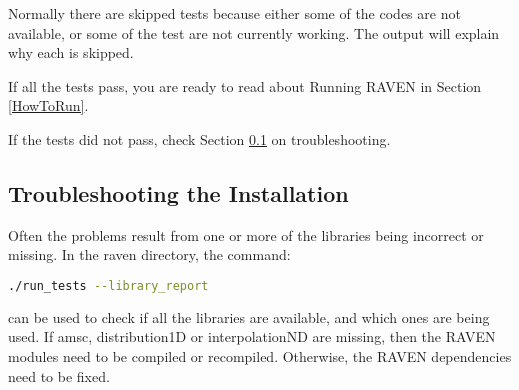 Normally there are skipped tests because either some of the codes are
not available, or some of the test are not currently working.  The
output will explain why each is skipped.

If all the tests pass, you are ready to read about Running RAVEN in
Section \ref{HowToRun}.

If the tests did not pass, check Section
\ref{troubleshooting_installation} on troubleshooting.

\subsection{Troubleshooting the Installation}
\label{troubleshooting_installation}

Often the problems result from one or more of the libraries being
incorrect or missing.  In the raven directory, the command:

\begin{lstlisting}[language=bash]
./run_tests --library_report
\end{lstlisting}
can be used to check if all the libraries are available, and which
ones are being used.  If amsc, distribution1D or interpolationND are
missing, then the RAVEN modules need to be compiled or recompiled.
Otherwise, the RAVEN dependencies need to be fixed.

